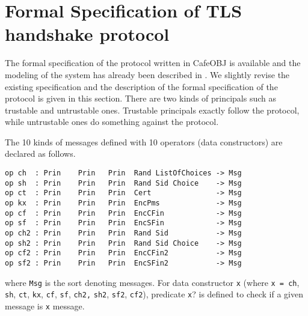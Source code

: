 \documentclass[a4paper,fleqn]{cas-dc}
\begin{document}
\section{Formal Specification of TLS handshake protocol} \label{fstls}
The formal specification of the protocol written in CafeOBJ is available and the modeling of the system has already been described in \cite{1437139}. We slightly revise the existing specification and the description of the formal specification of the protocol is given in this section. There are two kinds of principals such as trustable and untrustable ones. Trustable principals exactly follow the protocol, while untrustable ones do something against the protocol. 


The 10 kinds of messages defined with 10 operators (data constructors) are declared as follows.
\begin{small}
		\begin{verbatim}
op ch  : Prin    Prin   Prin  Rand ListOfChoices -> Msg
op sh  : Prin    Prin   Prin  Rand Sid Choice    -> Msg
op ct  : Prin    Prin   Prin  Cert               -> Msg
op kx  : Prin    Prin   Prin  EncPms             -> Msg
op cf  : Prin    Prin   Prin  EncCFin            -> Msg
op sf  : Prin    Prin   Prin  EncSFin            -> Msg
op ch2 : Prin    Prin   Prin  Rand Sid           -> Msg
op sh2 : Prin    Prin   Prin  Rand Sid Choice    -> Msg
op cf2 : Prin    Prin   Prin  EncCFin2           -> Msg
op sf2 : Prin    Prin   Prin  EncSFin2           -> Msg
		\end{verbatim}
	\end{small}
where \verb!Msg! is the sort denoting messages. For data constructor \verb!x! (where \verb!x = ch!, \verb!sh!, \verb!ct!, \verb!kx!, \verb!cf!, \verb!sf!, \verb!ch2,! \verb!sh2!, \verb!sf2!, \verb!cf2!), predicate \verb!x!? is defined to check if a given message is \verb!x! message.
\end{document}

